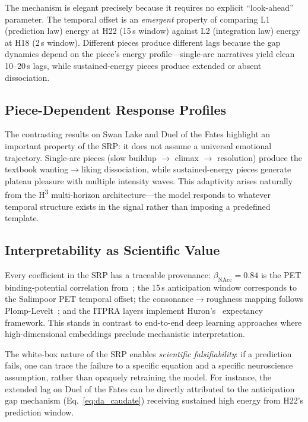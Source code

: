 \documentclass[10pt,twocolumn]{article}
\newcommand{\Htri}{H\textsuperscript{3}}
\begin{document}
The mechanism is elegant precisely because it requires no explicit ``look-ahead'' parameter. The temporal offset is an \textit{emergent} property of comparing L1 (prediction law) energy at H22 (15\,s window) against L2 (integration law) energy at H18 (2\,s window). Different pieces produce different lags because the gap dynamics depend on the piece's energy profile---single-arc narratives yield clean 10--20\,s lags, while sustained-energy pieces produce extended or absent dissociation.

\subsection{Piece-Dependent Response Profiles}

The contrasting results on Swan Lake and Duel of the Fates highlight an important property of the SRP: it does not assume a universal emotional trajectory. Single-arc pieces (slow buildup $\to$ climax $\to$ resolution) produce the textbook wanting$\to$liking dissociation, while sustained-energy pieces generate plateau pleasure with multiple intensity waves. This adaptivity arises naturally from the \Htri{} multi-horizon architecture---the model responds to whatever temporal structure exists in the signal rather than imposing a predefined template.

\subsection{Interpretability as Scientific Value}

Every coefficient in the SRP has a traceable provenance: $\beta_\text{NAcc} = 0.84$ is the PET binding-potential correlation from~\cite{Salimpoor2011}; the 15\,s anticipation window corresponds to the Salimpoor PET temporal offset; the consonance$\to$roughness mapping follows Plomp-Levelt~\cite{Plomp1965}; and the ITPRA layers implement Huron's~\cite{Huron2006} expectancy framework. This stands in contrast to end-to-end deep learning approaches where high-dimensional embeddings preclude mechanistic interpretation.

The white-box nature of the SRP enables \textit{scientific falsifiability}: if a prediction fails, one can trace the failure to a specific equation and a specific neuroscience assumption, rather than opaquely retraining the model. For instance, the extended lag on Duel of the Fates can be directly attributed to the anticipation gap mechanism (Eq.~\ref{eq:da_caudate}) receiving sustained high energy from H22's prediction window.
\end{document}

